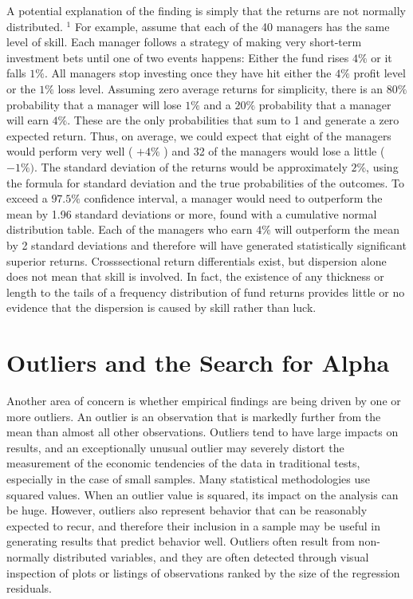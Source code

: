 \documentclass[11pt]{article}
\begin{document}
A potential explanation of the finding is simply that the returns are not normally distributed. ${ }^{1}$ For example, assume that each of the 40 managers has the same level of skill. Each manager follows a strategy of making very short-term investment bets until one of two events happens: Either the fund rises $4 \%$ or it falls $1 \%$. All managers stop investing once they have hit either the $4 \%$ profit level or the $1 \%$ loss level. Assuming zero average returns for simplicity, there is an $80 \%$ probability that a manager will lose $1 \%$ and a $20 \%$ probability that a manager will earn $4 \%$. These are the only probabilities that sum to 1 and generate a zero expected return. Thus, on average, we could expect that eight of the managers would perform very well ( $+4 \%$ ) and 32 of the managers would lose a little ( $-1 \%)$. The standard deviation of the returns would be approximately $2 \%$, using the formula for standard deviation and the true probabilities of the outcomes. To exceed a $97.5 \%$ confidence interval, a manager would need to outperform the mean by 1.96 standard deviations or more, found with a cumulative normal distribution table. Each of the managers who earn $4 \%$ will outperform the mean by 2 standard deviations and therefore will have generated statistically significant superior returns. Crosssectional return differentials exist, but dispersion alone does not mean that skill is involved. In fact, the existence of any thickness or length to the tails of a frequency distribution of fund returns provides little or no evidence that the dispersion is caused by skill rather than luck.

\section*{Outliers and the Search for Alpha}
Another area of concern is whether empirical findings are being driven by one or more outliers. An outlier is an observation that is markedly further from the mean than almost all other observations. Outliers tend to have large impacts on results, and an exceptionally unusual outlier may severely distort the measurement of the economic tendencies of the data in traditional tests, especially in the case of small samples. Many statistical methodologies use squared values. When an outlier value is squared, its impact on the analysis can be huge. However, outliers also represent behavior that can be reasonably expected to recur, and therefore their inclusion in a sample may be useful in generating results that predict behavior well. Outliers often result from non-normally distributed variables, and they are often detected through visual inspection of plots or listings of observations ranked by the size of the regression residuals.
\end{document}
